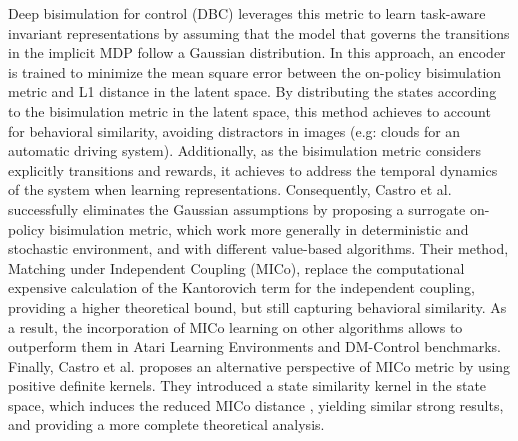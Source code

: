 Deep bisimulation for control (DBC) \cite{zhang2020learning} leverages this metric to learn task-aware invariant representations by assuming that the model that governs the transitions in the implicit MDP follow a Gaussian distribution. In this approach, an encoder is trained to minimize the mean square error between the on-policy bisimulation metric and L1 distance in the latent space. By distributing the states according to the bisimulation metric in the latent space, this method achieves to account for behavioral similarity, avoiding distractors in images (e.g: clouds for an automatic driving system). Additionally, as the bisimulation metric considers explicitly transitions and rewards, it achieves to address the temporal dynamics of the system when learning representations. Consequently, Castro et al. \cite{castro2021mico} successfully eliminates the Gaussian assumptions by proposing a surrogate on-policy bisimulation metric, which work more generally in deterministic and stochastic environment, and with different value-based algorithms. Their method, Matching under Independent Coupling (MICo), replace the computational expensive calculation of the Kantorovich term for the independent coupling, providing a higher theoretical bound, but still capturing behavioral similarity. As a result, the incorporation of MICo learning on other algorithms allows to outperform them in Atari Learning Environments and DM-Control benchmarks. Finally, Castro et al. \cite{castro2023kernel} proposes an alternative perspective of MICo metric by using positive definite kernels. They introduced a state similarity kernel in the state space, which induces the reduced MICo distance \cite{castro2021mico}, yielding similar strong results, and providing a more complete theoretical analysis.





